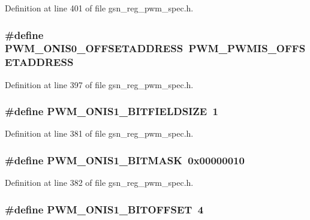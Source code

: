 Definition at line 401 of file gsn\_\-reg\_\-pwm\_\-spec.h.

\hypertarget{a00565_a44a0b021d6963a4246ea3081a5dd50ad}{
\subsubsection[{PWM\_\-ONIS0\_\-OFFSETADDRESS}]{\setlength{\rightskip}{0pt plus 5cm}\#define PWM\_\-ONIS0\_\-OFFSETADDRESS~PWM\_\-PWMIS\_\-OFFSETADDRESS}}
\label{a00565_a44a0b021d6963a4246ea3081a5dd50ad}


Definition at line 397 of file gsn\_\-reg\_\-pwm\_\-spec.h.

\hypertarget{a00565_a385174e318896f04ac28315523b32ef1}{
\subsubsection[{PWM\_\-ONIS1\_\-BITFIELDSIZE}]{\setlength{\rightskip}{0pt plus 5cm}\#define PWM\_\-ONIS1\_\-BITFIELDSIZE~1}}
\label{a00565_a385174e318896f04ac28315523b32ef1}


Definition at line 381 of file gsn\_\-reg\_\-pwm\_\-spec.h.

\hypertarget{a00565_a3a8368d37598a3e06ac0adbcbb45dce1}{
\subsubsection[{PWM\_\-ONIS1\_\-BITMASK}]{\setlength{\rightskip}{0pt plus 5cm}\#define PWM\_\-ONIS1\_\-BITMASK~0x00000010}}
\label{a00565_a3a8368d37598a3e06ac0adbcbb45dce1}


Definition at line 382 of file gsn\_\-reg\_\-pwm\_\-spec.h.

\hypertarget{a00565_a30c2aa672bf574153e6aca0d0202dee7}{
\subsubsection[{PWM\_\-ONIS1\_\-BITOFFSET}]{\setlength{\rightskip}{0pt plus 5cm}\#define PWM\_\-ONIS1\_\-BITOFFSET~4}}
\label{a00565_a30c2aa672bf574153e6aca0d0202dee7}


